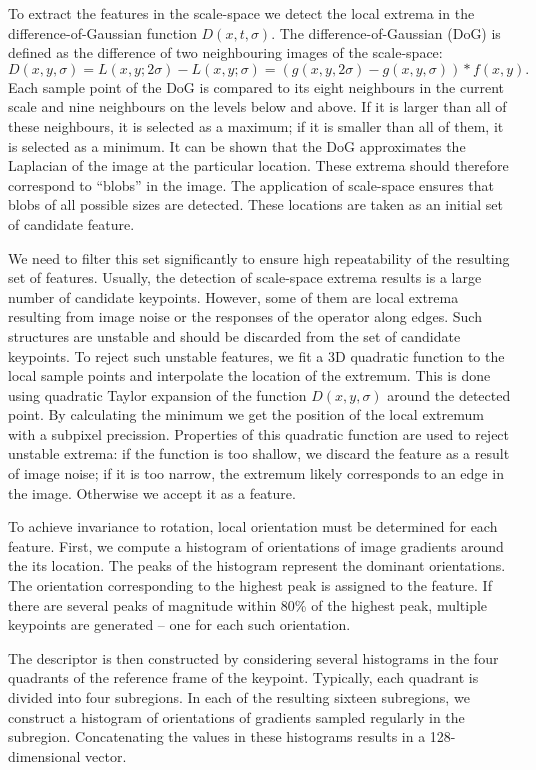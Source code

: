 To extract the features in the scale-space we detect the local extrema in the difference-of-Gaussian function $D(x, t, \sigma)$.
The difference-of-Gaussian (DoG) is defined as the difference of two neighbouring images of the scale-space: 
\[
 D(x, y, \sigma) = L(x, y; 2\sigma) - L(x, y; \sigma) = (g(x, y, 2\sigma) - g(x, y, \sigma)) * f(x, y).
\]
Each sample point of the DoG is compared to its eight neighbours in the current scale and nine neighbours on the levels below and above.
If it is larger than all of these neighbours, it is selected as a maximum; if it is smaller than all of them, it is selected as a minimum. 
It can be shown that the DoG approximates the Laplacian of the image at the particular location. 
These extrema should therefore correspond to ``blobs'' in the image.
The application of scale-space ensures that blobs of all possible sizes are detected. 
These locations are taken as an initial set of candidate feature. 

We need to filter this set significantly to ensure high repeatability of the resulting set of features. 
Usually, the detection of scale-space extrema results is a large number of candidate keypoints. 
However, some of them are local extrema resulting from image noise or the responses of the operator along edges. 
Such structures are unstable and should be discarded from the set of candidate keypoints.
To reject such unstable features, we fit a 3D quadratic function to the local sample points and interpolate the location of the extremum.
This is done using quadratic Taylor expansion of the function $D(x, y, \sigma)$ around the detected point.
By calculating the minimum we get the position of the local extremum with a subpixel precission.
Properties of this quadratic function are used to reject unstable extrema: if the function is too shallow, we discard the feature as a result of image noise; if it is too narrow, the extremum likely corresponds to an edge in the image.  
Otherwise we accept it as a feature.

To achieve invariance to rotation, local orientation must be determined for each feature. 
First, we compute a histogram of orientations of image gradients around the its location. 
The peaks of the histogram represent the dominant orientations. 
The orientation corresponding to the highest peak is assigned to the feature. 
If there are several peaks of magnitude within 80\% of the highest peak, multiple keypoints are generated -- one for each such orientation.

The descriptor is then constructed by considering several histograms in the four quadrants of the reference frame of the keypoint.
Typically, each quadrant is divided into four subregions. 
In each of the resulting sixteen subregions, we construct a histogram of orientations of gradients sampled regularly in the subregion. 
Concatenating the values in these histograms results in a 128-dimensional vector.


